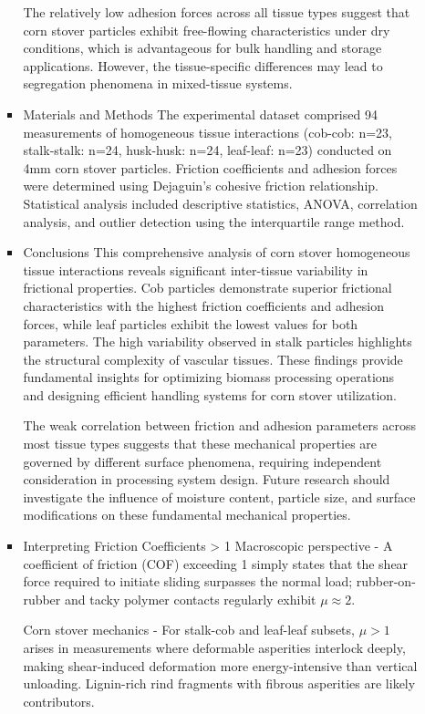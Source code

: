 \documentclass[xcolor=dvipsnames,10pt,hidelinks]{article}
\begin{document}
\begin{itemize}
\begin{itemize}
\begin{itemize}
The relatively low adhesion forces across all tissue types suggest that corn stover particles exhibit free-flowing characteristics under dry conditions, which is advantageous for bulk handling and storage applications. However, the tissue-specific differences may lead to segregation phenomena in mixed-tissue systems.
\item Materials and Methods \newline
\label{sec:org0218db5}
The experimental dataset comprised 94 measurements of homogeneous tissue interactions (cob-cob: n=23, stalk-stalk: n=24, husk-husk: n=24, leaf-leaf: n=23) conducted on 4mm corn stover particles. Friction coefficients and adhesion forces were determined using Dejaguin's cohesive friction relationship. Statistical analysis included descriptive statistics, ANOVA, correlation analysis, and outlier detection using the interquartile range method.
\item Conclusions \newline
\label{sec:org708b43a}
This comprehensive analysis of corn stover homogeneous tissue interactions reveals significant inter-tissue variability in frictional properties. Cob particles demonstrate superior frictional characteristics with the highest friction coefficients and adhesion forces, while leaf particles exhibit the lowest values for both parameters. The high variability observed in stalk particles highlights the structural complexity of vascular tissues. These findings provide fundamental insights for optimizing biomass processing operations and designing efficient handling systems for corn stover utilization.

The weak correlation between friction and adhesion parameters across most tissue types suggests that these mechanical properties are governed by different surface phenomena, requiring independent consideration in processing system design. Future research should investigate the influence of moisture content, particle size, and surface modifications on these fundamental mechanical properties.
\item Interpreting Friction Coefficients > 1 \newline
\label{sec:orgd41b801}
Macroscopic perspective - A coefficient of friction (COF) exceeding 1 simply states that the shear force required to initiate sliding surpasses the normal load; rubber-on-rubber and tacky polymer contacts regularly exhibit \(\mu\approx 2\).

Corn stover mechanics - For stalk-cob and leaf-leaf subsets, \(\mu > 1\)  arises in measurements where deformable asperities interlock deeply, making shear-induced deformation more energy-intensive than vertical unloading. Lignin-rich rind fragments with fibrous asperities are likely contributors.


\end{itemize}
\end{itemize}
\end{itemize}
\end{document}
